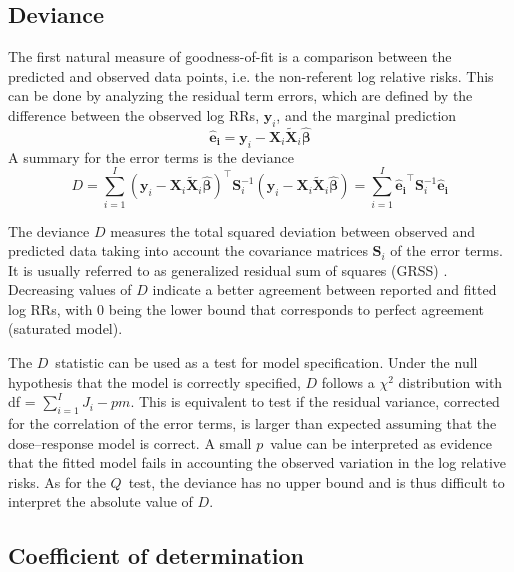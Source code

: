 \documentclass[11pt,a4paper,twoside,openany]{book}\usepackage{knitr}
\begin{document}
{{\subsection{Deviance} 

The first natural measure of goodness-of-fit is a comparison between the predicted and observed data points, i.e. the non-referent log relative risks. This can be done by analyzing the residual term errors, which are defined by the difference between the observed log RRs, $\mathbf{y}_i$, and the marginal prediction
\begin{equation}
\boldsymbol{\hat e_i} = \mathbf{y}_i - \mathbf{X}_i \widetilde{\mathbf{X}}_i \boldsymbol{\hat \beta}
\label{eq:residual}
\end{equation}\noindent A summary for the error terms is the deviance
\begin{equation}
D = \sum_{i=1}^I \left(\mathbf{y}_i - \mathbf{X}_i \widetilde{\mathbf{X}}_i \boldsymbol{\hat \beta} \right)^\top \mathbf{S}_i^{-1} \left(\mathbf{y}_i -\mathbf{X}_i \widetilde{\mathbf{X}}_i \boldsymbol{\hat \beta} \right) = \sum_{i=1}^I \boldsymbol{\hat e_i}^\top \mathbf{S}_i^{-1} \boldsymbol{\hat e_i}
\label{eq:deviance}
\end{equation}

\noindent The deviance $D$ measures the total squared deviation between observed and predicted data taking into account the covariance matrices $\mathbf{S}_i$ of the error terms. It is usually referred to as generalized residual sum of squares (GRSS) \citep{draper2014applied}. Decreasing values of $D$ indicate a better agreement between reported and fitted log RRs, with 0 being the lower bound that corresponds to perfect agreement (saturated model).

\noindent The $D$~statistic can be used as a test for model specification. Under the null hypothesis that the model is correctly specified, $D$ follows a $\chi^2$ distribution with df = $\sum_{i=1}^I J_i - pm$. This is equivalent to test if the residual variance, corrected for the correlation of the error terms, is larger than expected assuming that the dose--response model is correct. A small $p$~value can be interpreted as evidence that the fitted model fails in accounting the observed variation in the log relative risks. As for the $Q$~test, the deviance has no upper bound and is thus difficult to interpret the absolute value of $D$.

\subsection{Coefficient of determination}

}}
\end{document}
